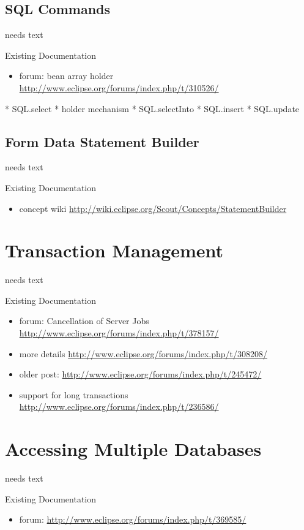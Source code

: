 \documentclass[a4paper,10pt,twoside]{book}
\begin{document}
\subsection{SQL Commands}
needs text

\noindent Existing Documentation
\begin{itemize}
  \item forum: bean array holder \url{http://www.eclipse.org/forums/index.php/t/310526/}
\end{itemize}

* SQL.select
* holder mechanism
* SQL.selectInto
* SQL.insert
* SQL.update

\subsection{Form Data Statement Builder}
needs text

\noindent Existing Documentation
\begin{itemize}
  \item concept wiki \url{http://wiki.eclipse.org/Scout/Concepts/StatementBuilder}
\end{itemize}


\section{Transaction Management}
needs text

\noindent Existing Documentation
\begin{itemize}
  \item forum: Cancellation of Server Jobs \url{http://www.eclipse.org/forums/index.php/t/378157/}
  \item more details \url{http://www.eclipse.org/forums/index.php/t/308208/}
  \item older post: \url{http://www.eclipse.org/forums/index.php/t/245472/}
  \item support for long transactions \url{http://www.eclipse.org/forums/index.php/t/236586/}
\end{itemize}

\section{Accessing Multiple Databases}
needs text

\noindent Existing Documentation
\begin{itemize}
  \item forum: \url{http://www.eclipse.org/forums/index.php/t/369585/}
\end{itemize}
\end{document}
